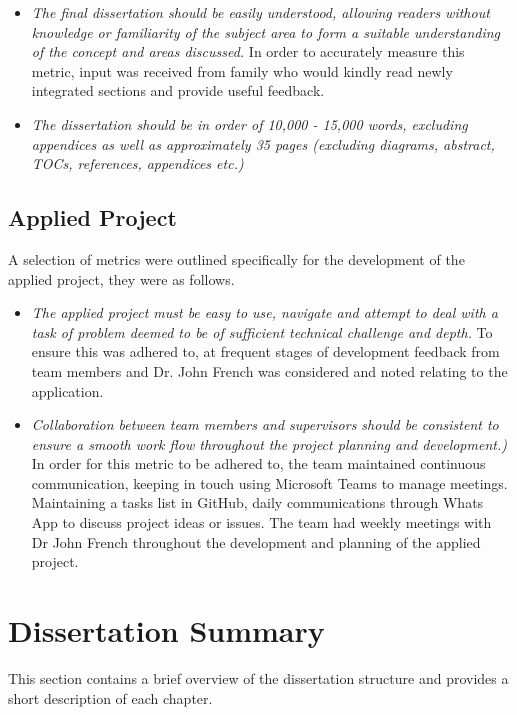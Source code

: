 \begin{itemize}

    \item \emph{The final dissertation should be easily understood, allowing readers without knowledge or familiarity of the subject area to form a suitable understanding of the concept and areas discussed.} In order to accurately measure this metric, input was received from family who would kindly read newly integrated sections and provide useful feedback.

    \item \emph{The  dissertation should be in order of 10,000 - 15,000 words, excluding appendices as well as approximately 35 pages (excluding diagrams, abstract, TOCs, references, appendices etc.)}

\end{itemize}

\subsection{Applied Project}
A selection of metrics were outlined specifically for the development of the applied project, they were as follows.

\begin{itemize}

    \item \emph{The applied project must be easy to use, navigate and attempt to deal with a task of problem deemed to be of sufficient technical challenge and depth.} To ensure this was adhered to, at frequent stages of development feedback from team members and Dr. John French was considered and noted relating to the application.

    \item \emph{Collaboration between team members and supervisors should be consistent to ensure a smooth work flow throughout the project planning and development.)} In order for this metric to be adhered to, the team maintained continuous communication, keeping in touch using Microsoft Teams to manage meetings. Maintaining a tasks list in GitHub, daily communications through Whats App to discuss project ideas or issues.
    The team had weekly meetings with Dr John French throughout the development and planning of the applied project.

\end{itemize}

\section{Dissertation Summary}
This section contains a brief overview of the dissertation structure and provides a short description of each chapter.

